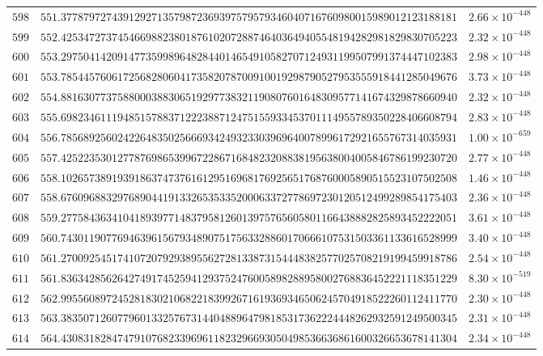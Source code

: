 \documentclass[12pt,reqno]{amsart}
\theoremstyle{remark}
\begin{document}
\begin{longtable}{clc}
$598$ & $551.3778797274391292713579872369397579579346040716760980015989012123188181$ & $2.66\times 10^{-448}$ \\
$599$ & $552.4253472737454669882380187610207288746403649405548194282981829830705223$ & $2.32\times 10^{-448}$ \\
$600$ & $553.2975041420914773599896482844014654910582707124931199507991374447102383$ & $2.98\times 10^{-448}$ \\
$601$ & $553.7854457606172568280604173582078700910019298790527953555918441285049676$ & $3.73\times 10^{-448}$ \\
$602$ & $554.8816307737588000388306519297738321190807601648309577141674329878660940$ & $2.32\times 10^{-448}$ \\
$603$ & $555.6982346111948515788371222388712475155933453701114955789350228406608794$ & $2.83\times 10^{-448}$ \\
$604$ & $556.7856892560242264835025666934249323303969640078996172921655767314035931$ & $1.00\times 10^{-659}$ \\
$605$ & $557.4252235301277876986539967228671684823208838195638004005846786199230720$ & $2.77\times 10^{-448}$ \\
$606$ & $558.1026573891939186374737616129516968176925651768760005890515523107502508$ & $1.46\times 10^{-448}$ \\
$607$ & $558.6760968832976890441913326535335200063372778697230120512499289854175403$ & $2.36\times 10^{-448}$ \\
$608$ & $559.2775843634104189397714837958126013975765605801166438882825893452222051$ & $3.61\times 10^{-448}$ \\
$609$ & $560.7430119077694639615679348907517563328860170666107531503361133616528999$ & $3.40\times 10^{-448}$ \\
$610$ & $561.2700925451741072079293895562728133873154448382577025708219199459918786$ & $2.54\times 10^{-448}$ \\
$611$ & $561.8363428562642749174525941293752476005898288958002768836452221118351229$ & $8.30\times 10^{-519}$ \\
$612$ & $562.9955608972452818302106822183992671619369346506245704918522260112411770$ & $2.30\times 10^{-448}$ \\
$613$ & $563.3835071260779601332576731440488964798185317362224448262932591249500345$ & $2.31\times 10^{-448}$ \\
$614$ & $564.4308318284747910768233969611823296693050498536636861600326653678141304$ & $2.34\times 10^{-448}$ \\

\end{longtable}
\end{document}
